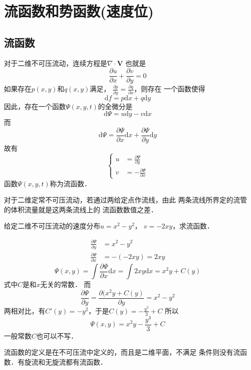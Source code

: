 \section{流函数和势函数(速度位)}

\subsection{流函数}
对于二维不可压流动，连续方程是$\nabla \cdot \mathbf{V}$
也就是
\[
  \frac{\partial u}{\partial x}+
  \frac{\partial v }{\partial y}=0
\]
如果存在$p(x,y)$和$q(x,y)$满足，
$\frac{\partial p }{\partial y}=
\frac{\partial q }{\partial x }$，则存在
一个函数使得
\[
  \mathrm{d}f=p \mathrm{d}x+q \mathrm{d}y 
\]
因此，存在一个函数$\Psi (x,y,t)$的全微分是
\[
  \mathrm{d}\Psi=u \mathrm{d}y-v \mathrm{d}x 
\]
而
\[
  \mathrm{d}\Psi =\frac{\partial \Psi}{\partial x }
  \mathrm{d}x+
  \frac{\partial \Psi }{\partial y }\mathrm{d}y 
\]
故有
\begin{equation*}
  \begin{cases}
    u&=\frac{\partial \Psi }{\partial y}\\ 
    v&=-\frac{\partial \Psi}{\partial x }
  \end{cases}
\end{equation*}
函数$\Psi(x,y,t)$称为流函数．
\begin{note}
对于二维定常不可压流动，若通过两给定点作流线，由此
两条流线所界定的流管的体积流量就是这两条流线上的
流函数数值之差．
\end{note}
\begin{example}
  给定二维不可压流动的速度分布$u=x^2-y^2$，
  $v=-2xy$，求流函数．

  \begin{equation*}
    \begin{split}
      \frac{\partial \Psi}{\partial y }&=x^2-y^2 \\ 
      \frac{\partial \Psi}{\partial x }&=-(-2xy)=2xy 
    \end{split}
  \end{equation*}
  \[
    \Psi(x,y)=\int \frac{\partial \Psi}{\partial x}
    \mathrm{d}x =\int 2xy \mathrm{d}x =
    x^2y+C(y) 
  \]
  式中$C$是和$x $无关的常数．
  而
  \[
    \frac{\partial \Psi }{\partial y }=
    \frac{\partial (x^2y+C(y)}{\partial y}=
    x^2-y^2
  \]
  两相对比，有$C'(y)=-y^2$，于是$C(y)=-\frac{y^3}{3 }+C $
  所以
  \[
    \Psi(x,y)=x^2y-\frac{y^3}{3}+C 
  \]
  一般常数$C $也可以不写．
\end{example}
\begin{note}
流函数的定义是在不可压流中定义的，而且是二维平面，不满足
条件则没有流函数．有旋流和无旋流都有流函数．
\end{note}
